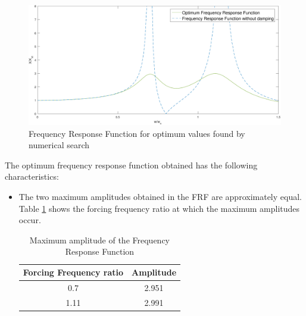 \begin{figure}
\includegraphics[scale=0.55]{"figures/optimum"}
\caption{Frequency Response Function for optimum values found by numerical search}
\label{optimum}
\end{figure}
\par
The optimum frequency response function obtained has the following characteristics:
\begin{itemize}
\item The two maximum amplitudes obtained in the FRF are approximately equal. Table \ref{maxamp} shows the forcing frequency ratio at which the maximum amplitudes occur.
\begin{table}[h]
\centering
\label{maxamp}
\caption{Maximum amplitude of the Frequency Response Function}
\begin{tabular}{|c|c|}
\hline
Forcing Frequency ratio & Amplitude \\ \hline
0.7 & 2.951 \\ \hline
1.11 & 2.991 \\ \hline
\end{tabular}
\end{table}
\end{itemize}